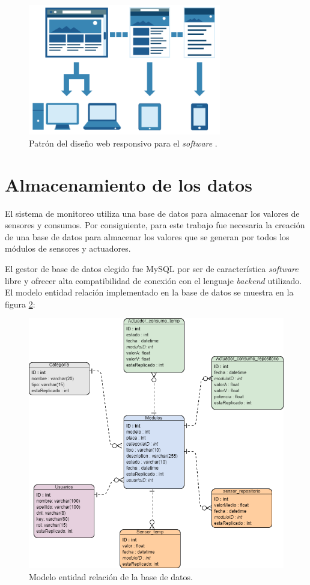 \begin{figure}[htpb]
\centering 
\includegraphics[width=0.75\textwidth]{./Figures/responsive3.png}
\caption{Patrón del diseño web responsivo para el \emph{software} \protect\footnotemark.}
\label{fig:patrondiseniosoftware}
\end{figure}



\section{Almacenamiento de los datos}

El sistema de monitoreo utiliza una base de datos para almacenar los valores de sensores y consumos. Por consiguiente, para este trabajo fue necesaria la creación de una base de datos para almacenar los valores que se generan por todos los módulos de sensores y actuadores. 

El gestor de base de datos elegido fue MySQL por ser de característica \emph{software} libre y ofrecer alta compatibilidad de conexión con el lenguaje \emph{backend} utilizado. El modelo entidad relación implementado en la base de datos se muestra en la figura \ref{fig:entidadrelacion}:

\begin{figure}[htpb]
\centering 
\includegraphics[width=1.0\textwidth]{./Figures/entidad-relacion.png}
\caption{Modelo entidad relación de la base de datos.}
\label{fig:entidadrelacion}
\end{figure}